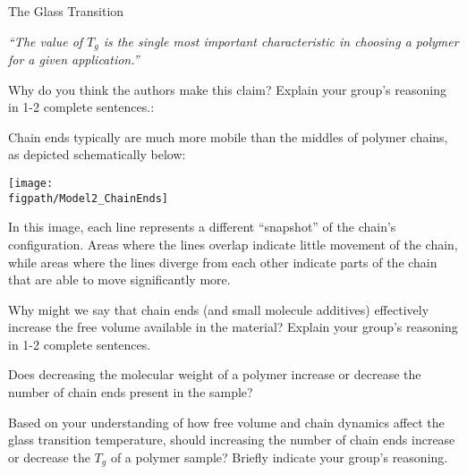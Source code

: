 \begin{activity}{The Glass Transition}
\begin{ctqs}
		\emph{``The value of $T_g$ is the single most important characteristic in choosing a polymer for a given application.''}
		
		Why do you think the authors make this claim?  Explain your group's reasoning in 1-2 complete sentences.:
			
				\begin{solution}[1.5in]
				\end{solution}
	
\end{ctqs}

\begin{model}
	
	Chain ends typically are much more mobile than the middles of polymer chains, as depicted schematically below:
	
	\centerline{\texttt{[image: \\figpath/Model2\_ChainEnds]}}
	
	In this image, each line represents a different ``snapshot'' of the chain's configuration.  Areas where the lines overlap indicate little movement of the chain, while areas where the lines diverge from each other indicate parts of the chain that are able to move significantly more.
	
\end{model}

\begin{ctqs}

	\question Why might we say that chain ends (and small molecule additives) effectively increase the free volume available in the material? Explain your group's reasoning in 1-2 complete sentences.
	
		\begin{solution}[1in]
		\end{solution}
	
	\question Does decreasing the molecular weight of a polymer increase or decrease the number of chain ends present in the sample?
	
		\begin{solution}[0.25in]
		\end{solution}
	
	\question Based on your understanding of how free volume and chain dynamics affect the glass transition temperature, should increasing the number of chain ends increase or decrease the $T_g$ of a polymer sample?  Briefly indicate your group's reasoning.
	
		\begin{solution}[0.75in]
		\end{solution}
	

\end{ctqs}
\end{activity}
